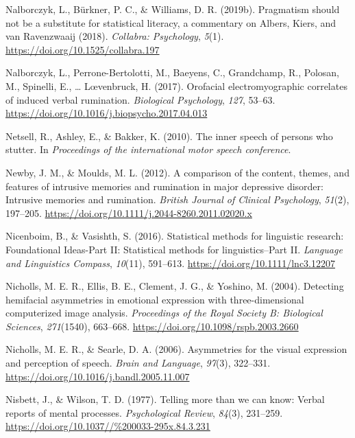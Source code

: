 \documentclass[a4paper,12pt,twoside,openright,oldfontcommands]{memoir}
\begin{document}
\leavevmode\hypertarget{ref-nalborczyk_pragmatism_2019}{}%
Nalborczyk, L., Bürkner, P. C., \& Williams, D. R. (2019b). Pragmatism should not be a substitute for statistical literacy, a commentary on Albers, Kiers, and van Ravenzwaaij (2018). \emph{Collabra: Psychology}, \emph{5}(1). \url{https://doi.org/10.1525/collabra.197}

\leavevmode\hypertarget{ref-nalborczyk_orofacial_2017}{}%
Nalborczyk, L., Perrone-Bertolotti, M., Baeyens, C., Grandchamp, R., Polosan, M., Spinelli, E., \ldots{} Lœvenbruck, H. (2017). Orofacial electromyographic correlates of induced verbal rumination. \emph{Biological Psychology}, \emph{127}, 53--63. \url{https://doi.org/10.1016/j.biopsycho.2017.04.013}

\leavevmode\hypertarget{ref-netsell_inner_2010}{}%
Netsell, R., Ashley, E., \& Bakker, K. (2010). The inner speech of persons who stutter. In \emph{Proceedings of the international motor speech conference}.

\leavevmode\hypertarget{ref-newby_comparison_2012}{}%
Newby, J. M., \& Moulds, M. L. (2012). A comparison of the content, themes, and features of intrusive memories and rumination in major depressive disorder: Intrusive memories and rumination. \emph{British Journal of Clinical Psychology}, \emph{51}(2), 197--205. \url{https://doi.org/10.1111/j.2044-8260.2011.02020.x}

\leavevmode\hypertarget{ref-nicenboim_statistical_2016}{}%
Nicenboim, B., \& Vasishth, S. (2016). Statistical methods for linguistic research: Foundational Ideas-Part II: Statistical methods for linguistics--Part II. \emph{Language and Linguistics Compass}, \emph{10}(11), 591--613. \url{https://doi.org/10.1111/lnc3.12207}

\leavevmode\hypertarget{ref-nicholls_detecting_2004}{}%
Nicholls, M. E. R., Ellis, B. E., Clement, J. G., \& Yoshino, M. (2004). Detecting hemifacial asymmetries in emotional expression with three-dimensional computerized image analysis. \emph{Proceedings of the Royal Society B: Biological Sciences}, \emph{271}(1540), 663--668. \url{https://doi.org/10.1098/rspb.2003.2660}

\leavevmode\hypertarget{ref-nicholls_asymmetries_2006}{}%
Nicholls, M. E. R., \& Searle, D. A. (2006). Asymmetries for the visual expression and perception of speech. \emph{Brain and Language}, \emph{97}(3), 322--331. \url{https://doi.org/10.1016/j.bandl.2005.11.007}

\leavevmode\hypertarget{ref-nisbett_telling_1977}{}%
Nisbett, J., \& Wilson, T. D. (1977). Telling more than we can know: Verbal reports of mental processes. \emph{Psychological Review}, \emph{84}(3), 231--259. \url{https://doi.org/10.1037//\%200033-295x.84.3.231}
\end{document}
